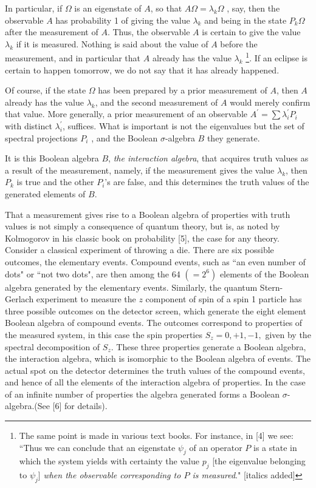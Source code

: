 \documentclass[12pt]{article}
\begin{document}
In particular, if $\Omega$  is an eigenstate of $A$, so that $A \Omega = \lambda_k \Omega$ , say, then the observable $A$ has probability 1 of giving the value $\lambda_k$  and being in the state $P_k\Omega$  after the measurement of $A$. Thus, the observable $A$ is certain to give the value $\lambda_k$ if it is measured. Nothing is said about the value of $A$ before the measurement, and in particular that $A$ already has the value $\lambda_k$ \footnote{The same point is made in various text books. For instance, in [4] we see: ``Thus we can conclude that an eigenstate $\psi_j$ of an operator $P$ is a state in which the system yields with certainty the value $p_j$ [the eigenvalue belonging to $\psi_j$] \textit{when the observable corresponding to $P$ is measured}."       [italics added]}. If an eclipse is certain to happen tomorrow, we do not say that it has already happened.

Of course, if the state $\Omega$ has been prepared by a prior measurement of $A$, then $A$ already has the value $\lambda_k$, and the second measurement of $A$ would merely confirm that value. More generally, a prior measurement of an observable $A^\prime = \sum \lambda^\prime_i P_i$ with distinct $\lambda^\prime_i$, suffices. What is important is not the eigenvalues but the set of spectral projections $P_i$ , and the Boolean $\sigma$-algebra $B$ they generate.        

It is this Boolean algebra $B$, \textit{the interaction algebra}, that acquires truth values as a result of the measurement, namely, if the measurement gives the value $\lambda_k$, then $P_k$ is true and the other $P_i$'s are false, and this determines the truth values of the generated elements of $B$. 

That a measurement gives rise to a Boolean algebra of properties with truth values is not simply a consequence of quantum theory, but is, as noted by Kolmogorov in his classic book on probability [5], the case for any theory. Consider a classical experiment of throwing a die. There are six possible outcomes, the elementary events. Compound events, such as ``an even number of dots" or ``not two dots", are then among the 64 $(= 2^6)$ elements of the Boolean algebra generated by the elementary events. Similarly, the quantum Stern-Gerlach experiment to measure the $z$ component of spin of a spin 1 particle has three possible outcomes on the detector screen, which generate the eight element Boolean algebra of compound events. The outcomes correspond to properties of the measured system, in this case the spin properties $S_z = 0,+1,-1,$ given by the spectral decomposition of $S_z$.  These three properties generate a Boolean algebra, the interaction algebra, which is isomorphic to the Boolean algebra of events.  The actual spot on the detector determines the truth values of the compound events, and hence of all the elements of the interaction algebra of properties. In the case of an infinite number of properties the algebra generated forms a Boolean $\sigma$-algebra.(See [6] for details).
\end{document}

